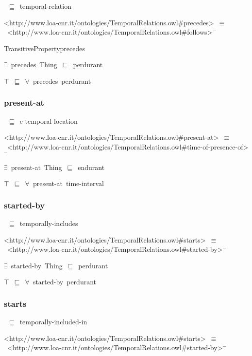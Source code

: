 \documentclass{article}
\begin{document}
~\ensuremath{\sqsubseteq}~temporal-relation

<http://www.loa-cnr.it/ontologies/TemporalRelations.owl#precedes>~\ensuremath{\equiv}~<http://www.loa-cnr.it/ontologies/TemporalRelations.owl#follows>\ensuremath{^-}

TransitivePropertyprecedes

\ensuremath{\exists}~precedes~Thing~\ensuremath{\sqsubseteq}~perdurant

\ensuremath{\top}~\ensuremath{\sqsubseteq}~\ensuremath{\forall}~precedes~perdurant

\subsubsection*{present-at}

~\ensuremath{\sqsubseteq}~e-temporal-location

<http://www.loa-cnr.it/ontologies/TemporalRelations.owl#present-at>~\ensuremath{\equiv}~<http://www.loa-cnr.it/ontologies/TemporalRelations.owl#time-of-presence-of>\ensuremath{^-}

\ensuremath{\exists}~present-at~Thing~\ensuremath{\sqsubseteq}~endurant

\ensuremath{\top}~\ensuremath{\sqsubseteq}~\ensuremath{\forall}~present-at~time-interval

\subsubsection*{started-by}

~\ensuremath{\sqsubseteq}~temporally-includes

<http://www.loa-cnr.it/ontologies/TemporalRelations.owl#starts>~\ensuremath{\equiv}~<http://www.loa-cnr.it/ontologies/TemporalRelations.owl#started-by>\ensuremath{^-}

\ensuremath{\exists}~started-by~Thing~\ensuremath{\sqsubseteq}~perdurant

\ensuremath{\top}~\ensuremath{\sqsubseteq}~\ensuremath{\forall}~started-by~perdurant

\subsubsection*{starts}

~\ensuremath{\sqsubseteq}~temporally-included-in

<http://www.loa-cnr.it/ontologies/TemporalRelations.owl#starts>~\ensuremath{\equiv}~<http://www.loa-cnr.it/ontologies/TemporalRelations.owl#started-by>\ensuremath{^-}
\end{document}
